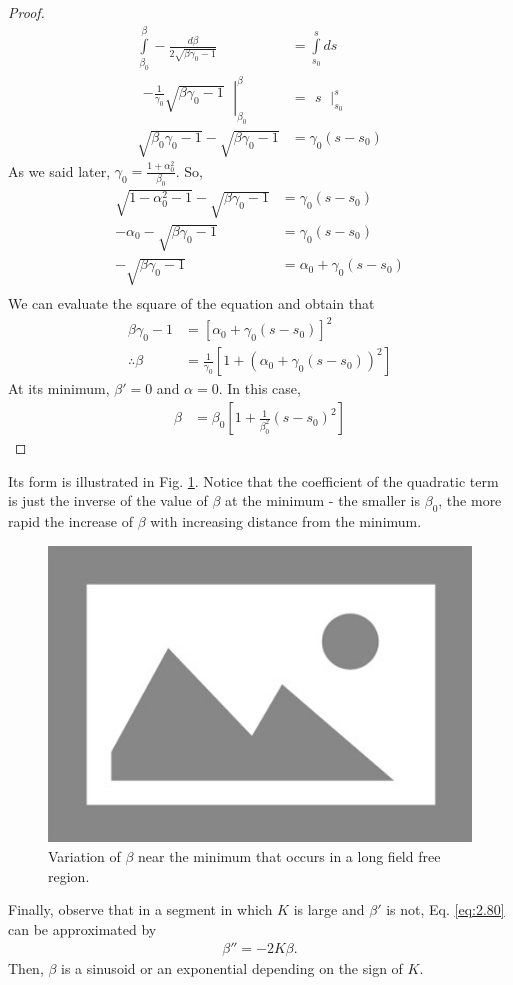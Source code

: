 \begin{proof}
	\begin{align*}
		\int\limits_{\beta_0}^{\beta}-\frac{d\beta}{2\sqrt{\beta\gamma_0 -1}} &= \int\limits_{s_0}^{s}ds\\
		\left.\begin{matrix}
		-\frac{1}{\gamma_0}\sqrt{\beta\gamma_0-1}
		\end{matrix}\ \right|^\beta_{\beta_0} &= \left.\begin{matrix}
				s
				\end{matrix}\ \right|^s_{s_0}\\
		\sqrt{\beta_0\gamma_0-1}-\sqrt{\beta\gamma_0-1} &= \gamma_0(s-s_0)
	\end{align*}
	As we said later, $\gamma_0 = \frac{1+\alpha_0^2}{\beta_0}$. So,
	\begin{align*}
		\sqrt{1-\alpha_0^2-1}-\sqrt{\beta\gamma_0-1} &= \gamma_0(s-s_0)\\
		-\alpha_0-\sqrt{\beta\gamma_0-1} &= \gamma_0(s-s_0)\\
		-\sqrt{\beta\gamma_0-1} &= \alpha_0+\gamma_0(s-s_0)\\
	\end{align*}
	We can evaluate the square of the equation and obtain that
	\begin{align*}
		\beta\gamma_0-1 &= [\alpha_0+\gamma_0(s-s_0)]^2\\
		\therefore \beta &= \frac{1}{\gamma_0}[1+(\alpha_0+\gamma_0(s-s_0))^2]
	\end{align*}
	At its minimum, $\beta'=0$ and $\alpha=0$. In this case,
	\begin{align*}
		\beta &= \beta_0\left[1+\frac{1}{\beta_0^2}(s-s_0)^2\right]
	\end{align*}
\end{proof}

Its form is illustrated in Fig. \ref{fig:fig20}. Notice that the coefficient of the quadratic term is just the inverse of the value of $\beta$ at the minimum - the smaller is $\beta_0$, the more rapid the increase of $\beta$ with increasing distance from the minimum.

\begin{figure}[!htb]
	\centering
	\includegraphics[width=0.8\linewidth]{./Figuras/placeholder.png}
	\caption{Variation of $\beta$ near the minimum that occurs in a long field free region.}
	\label{fig:fig20}
\end{figure}

Finally, observe that in a segment in which $K$ is large and $\beta'$ is not, Eq. \eqref{eq:2.80} can be approximated by
\begin{align}
	\beta'' = -2 K \beta.
\end{align}
Then, $\beta$ is a sinusoid or an exponential depending on the sign of $K$.

